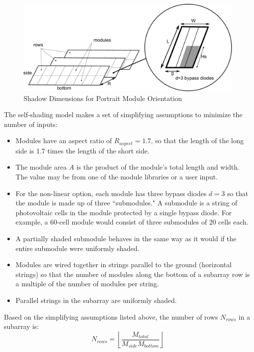 \documentclass[12pt,letterpaper]{article}
\begin{document}
\begin{figure}
\begin{center}
\includegraphics[scale=0.33]{self-shading-shadow-dimensions}
\caption{Shadow Dimensions for Portrait Module Orientation}
\label{fig-selfshaddimensions}
\end{center}
\end{figure}

The self-shading model makes a set of simplifying assumptions to minimize the number of inputs:

\begin{itemize}
\item Modules have an aspect ratio of $R_{aspect}=1.7$, so that the length of the long side is 1.7 times the length of the short side. 
\item The module area $A$ is the product of the module's total length and width. The value may be from one of the module libraries or a user input.
\item For the non-linear option, each module has three bypass diodes $d=3$ so that the module is made up of three ``submodules." A submodule is a string of photovoltaic cells in the module protected by a single bypass diode. For example, a 60-cell module would consist of three submodules of 20 cells each.
\item A partially shaded submodule behaves in the same way as it would if the entire submodule were uniformly shaded.
\item Modules are wired together in strings parallel to the ground (horizontal strings) so that the number of modules along the bottom of a subarray row is a multiple of the number of modules per string.
\item Parallel strings in the subarray are uniformly shaded.
\end{itemize}

Based on the simplifying assumptions listed above, the number of rows $N_{rows}$ in a subarray is:
\begin{equation}
N_{rows} = \left\lfloor \frac{M_{total}}{M_{side} M_{bottom}} \right\rfloor
\end{equation}
\end{document}
